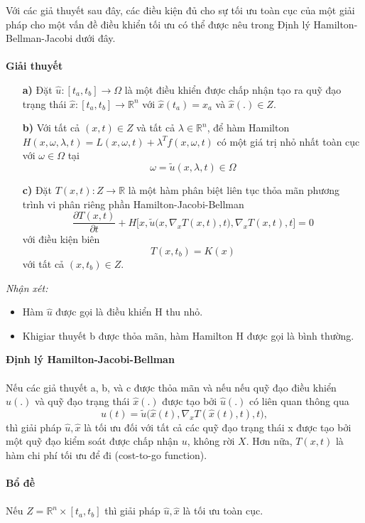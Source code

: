 \documentclass[12pt,a4paper]{report}
\begin{document}
	Với các giả thuyết sau đây, các điều kiện đủ cho sự tối ưu toàn cục của một giải pháp cho một vấn đề điều khiển tối ưu có thể được nêu trong Định lý Hamilton-Bellman-Jacobi dưới đây.\\\\
	\textbf{Giải thuyết}
	\begin{enumerate}
		\item[\textbf{a)}] Đặt $\hat{u}: [t_a, t_b] \to \Omega$ là một điều khiển được chấp nhận tạo ra quỹ đạo trạng thái $\hat{x}: [t_a, t_b] \to \mathbb{R}^n$ với $\hat{x}(t_a) = x_a$ và $\hat{x}(.) \in Z.$
		\item [\textbf{b)}] Với tất cả $(x, t) \in Z$ và tất cả $\lambda \in \mathbb{R}^n$, để hàm Hamilton $H(x, \omega, \lambda, t) = L(x, \omega, t) + \lambda^Tf(x, \omega, t)$ có một giá trị nhỏ nhất toàn cục với $\omega \in \Omega$ tại $$\omega = \tilde{u}(x, \lambda, t) \in \Omega $$
		\item[\textbf{c)}] Đặt $T(x, t): Z \to \mathbb{R}$ là một hàm phân biệt liên tục thỏa mãn phương trình vi phân riêng phần Hamilton-Jacobi-Bellman $$\frac{\partial T(x, t)}{\partial t} + H\bigg[x, \tilde{u}\big(x, \nabla_xT(x, t), t\big), \nabla_xT(x, t), t\bigg] = 0$$ với điều kiện biên $$T(x, t_b) = K(x)$$ với tất cả $(x, t_b) \in Z$.
	\end{enumerate}
		\textit{Nhận xét:}
		\begin{itemize}
			\item Hàm $\hat{u}$ được gọi là điều khiển H thu nhỏ.
			\item Khigiar thuyết b được thỏa mãn, hàm Hamilton H được gọi là bình thường. 
		\end{itemize}
		\textbf{Định lý Hamilton-Jacobi-Bellman} \\\\ Nếu các giả thuyết a, b, và c được thỏa mãn và nếu nếu quỹ đạo điều khiển $\hat{u}(.)$ và quỹ đạo trạng thái $\hat{x}(.)$ được tạo bởi $\hat{u}(.)$ có liên quan thông qua $$\hat{u}(t) = \tilde{u}\big(\hat{x}(t), \nabla_xT(\hat{x}(t), t), t\big), $$ 
		thì giải pháp $\hat{u}, \hat{x}$ là tối ưu đối với tất cả các quỹ đạo trạng thái x được tạo bởi một quỹ đạo kiểm soát được chấp nhận $u$, không rời $X$. Hơn nữa, $T(x, t)$ là hàm chi phí tối ưu để đi (cost-to-go function).
		\\\\
		\textbf{Bổ đề} \\\\ Nếu $Z = \mathbb{R}^n \times [t_a, t_b]$ thì giải pháp $\hat{u}, \hat{x}$ là tối ưu toàn cục.
\end{document}
